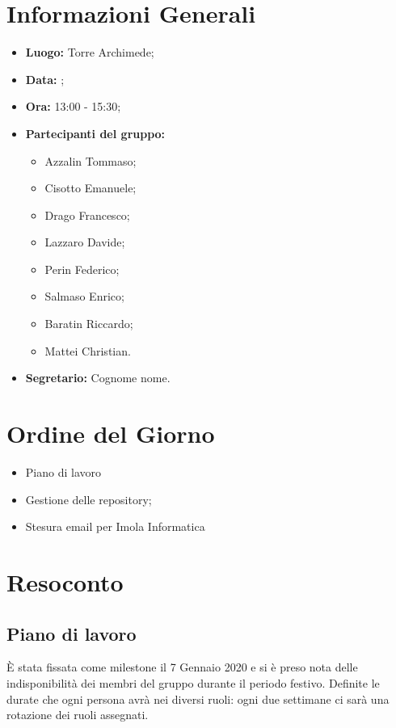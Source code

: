 \section{Informazioni Generali}
\begin{itemize}
\item \textbf{Luogo:} Torre Archimede;
\item \textbf{Data:} \Data;
\item \textbf{Ora:} 13:00 - 15:30;
\item \textbf{Partecipanti del gruppo:}
	\begin{itemize}
	\item Azzalin Tommaso; 
	\item Cisotto Emanuele; 
	\item Drago Francesco;
	\item Lazzaro Davide;
	\item Perin Federico;
	\item Salmaso Enrico;
	\item Baratin Riccardo;
	\item Mattei Christian.
	\end{itemize} 
\item \textbf{Segretario:} Cognome nome.
\end{itemize}

\clearpage

\section{Ordine del Giorno}
\begin{itemize}
\item Piano di lavoro
\item Gestione delle repository;
\item Stesura email per Imola Informatica
\end{itemize}

\clearpage

\section{Resoconto}
\subsection{Piano di lavoro}

È stata fissata come milestone il 7 Gennaio 2020 e si è preso nota delle indisponibilità dei membri del gruppo durante il periodo festivo. 
Definite le durate che ogni persona avrà nei diversi ruoli: ogni due settimane ci sarà una rotazione dei ruoli assegnati. \\

